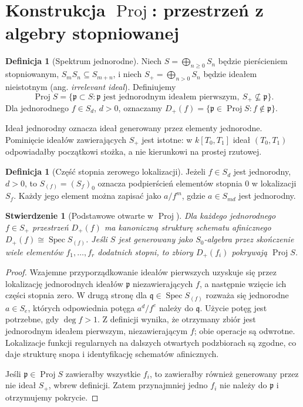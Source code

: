\documentclass[11pt,a4paper,openany]{report}
\numberwithin{equation}{section}
\theoremstyle{plain}
\newtheorem{stwierdzenie}[twierdzenie]{Stwierdzenie}
\theoremstyle{definition}
\newtheorem{definicja}[twierdzenie]{Definicja}
\theoremstyle{remark}
\newcommand{\Spec}{\operatorname{Spec}}
\begin{document}
\section{Konstrukcja \texorpdfstring{$\operatorname{Proj}$}{Proj}: przestrzeń z algebry stopniowanej}
\label{sec:ga5-proj}

\begin{definicja}[Spektrum jednorodne]
Niech $S=\bigoplus_{n\ge0}S_n$ będzie pierścieniem
stopniowanym, $S_mS_n\subseteq S_{m+n}$, i niech
$S_+=\bigoplus_{n>0}S_n$ będzie ideałem nieistotnym
(ang. \emph{irrelevant ideal}). Definiujemy
\[
 \operatorname{Proj}S=
 \{\mathfrak p\subset S:\mathfrak p\text{ jest jednorodnym ideałem
 pierwszym},\ S_+\not\subseteq\mathfrak p\}.
\]
Dla jednorodnego $f\in S_d$, $d>0$, oznaczamy
$D_+(f)=\{\mathfrak p\in\operatorname{Proj}S:f\notin\mathfrak p\}$.
\end{definicja}

Ideał jednorodny oznacza ideał generowany przez elementy
jednorodne. Pominięcie ideałów zawierających $S_+$ jest
istotne: w $k[T_0,T_1]$ ideał $(T_0,T_1)$ odpowiadałby
początkowi stożka, a nie kierunkowi na prostej rzutowej.

\begin{definicja}[Część stopnia zerowego lokalizacji]
Jeżeli $f\in S_d$ jest jednorodny, $d>0$, to
$S_{(f)}=(S_f)_0$ oznacza podpierścień elementów stopnia
$0$ w lokalizacji $S_f$. Każdy jego element można zapisać
jako $a/f^m$, gdzie $a\in S_{md}$ jest jednorodny.
\end{definicja}

\begin{stwierdzenie}[Podstawowe otwarte w $\operatorname{Proj}$]
\label{st:ga5-proj-charts}
Dla każdego jednorodnego $f\in S_+$ przestrzeń $D_+(f)$
ma kanoniczną strukturę schematu afinicznego
$D_+(f)\cong\Spec S_{(f)}$. Jeśli $S$ jest generowany
jako $S_0$-algebra przez skończenie wiele elementów
$f_1,\ldots,f_r$ dodatnich stopni, to zbiory $D_+(f_i)$
pokrywają $\operatorname{Proj}S$.
\end{stwierdzenie}
\begin{proof}
Wzajemne przyporządkowanie ideałów pierwszych uzyskuje się
przez lokalizację jednorodnych ideałów $\mathfrak p$
niezawierających $f$, a następnie wzięcie ich części
stopnia zero. W drugą stronę dla
$\mathfrak q\in\Spec S_{(f)}$ rozważa się jednorodne
$a\in S_e$, których odpowiednia potęga $a^d/f^e$
należy do $\mathfrak q$. Użycie potęg jest potrzebne,
gdy $\deg f>1$. Z definicji wynika, że otrzymany zbiór
jest jednorodnym ideałem pierwszym, niezawierającym $f$;
obie operacje są odwrotne. Lokalizacje funkcji regularnych
na dalszych otwartych podzbiorach są zgodne, co daje
strukturę snopa i identyfikację schematów afinicznych.

Jeśli $\mathfrak p\in\operatorname{Proj}S$ zawierałby
wszystkie $f_i$, to zawierałby również generowany
przez nie ideał $S_+$, wbrew definicji. Zatem
przynajmniej jedno $f_i$ nie należy do $\mathfrak p$
i otrzymujemy pokrycie.
\end{proof}
\end{document}
